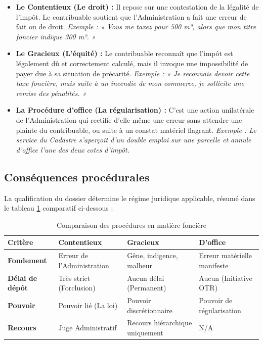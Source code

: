 \documentclass[Cours_contentieuxTF2026.tex]{subfiles}
\begin{document}
\begin{itemize}[label=\tiny$\blacksquare$]
	\item \textbf{Le Contentieux (Le droit) :} Il repose sur une contestation de la légalité de l'impôt. Le contribuable soutient que l'Administration a fait une erreur de fait ou de droit. 
	\textit{Exemple : « Vous me taxez pour 500 m², alors que mon titre foncier indique 300 m². »}
	
	\item \textbf{Le Gracieux (L'équité) :} Le contribuable reconnaît que l'impôt est légalement dû et correctement calculé, mais il invoque une impossibilité de payer due à sa situation de précarité.
	\textit{Exemple : « Je reconnais devoir cette taxe foncière, mais suite à un incendie de mon commerce, je sollicite une remise des pénalités. »}
	
	\item \textbf{La Procédure d'office (La régularisation) :} C'est une action unilatérale de l'Administration qui rectifie d'elle-même une erreur sans attendre une plainte du contribuable, ou suite à un constat matériel flagrant.
	\textit{Exemple : Le service du Cadastre s'aperçoit d'un double emploi sur une parcelle et annule d'office l'une des deux cotes d'impôt.}
\end{itemize}

\subsection{Conséquences procédurales}

La qualification du dossier détermine le régime juridique applicable, résumé dans le tableau \ref{tab:comp_proc_foncier} comparatif ci-dessous :

\begin{table}[H]
	\centering
	\begin{tabular}{|l|p{4cm}|p{4cm}|p{3.5cm}|}
		\hline
		\textbf{Critère} & \textbf{Contentieux} & \textbf{Gracieux} & \textbf{D'office} \\ \hline
		\textbf{Fondement} & Erreur de l'Administration & Gêne, indigence, malheur & Erreur matérielle manifeste \\ \hline
		\textbf{Délai de dépôt} & Très strict (Forclusion) & Aucun délai (Permanent) & Aucun (Initiative OTR) \\ \hline
		\textbf{Pouvoir} & Pouvoir lié (La loi) & Pouvoir discrétionnaire & Pouvoir de régularisation \\ \hline
		\textbf{Recours} & Juge Administratif & Recours hiérarchique uniquement & N/A \\ \hline
	\end{tabular}
	\caption{Comparaison des procédures en matière foncière}
	\label{tab:comp_proc_foncier}
\end{table}
\end{document}
